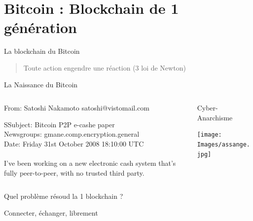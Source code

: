 \documentclass{beamer}
\begin{document}
\section{Bitcoin : Blockchain de 1\iere{} génération}
\label{sec:org863a5c7}
\begin{frame}[label={sec:org5d99e7b}]{La blockchain du Bitcoin}
  \begin{verse}
    Toute action engendre une réaction (3\ieme{} loi de Newton)\\
  \end{verse}
\end{frame}
\begin{frame}[label={sec:org3969a5e}]{La Naissance du Bitcoin}
  \begin{columns}
    \begin{column}{0.70\columnwidth}
      \begin{block}{From: Satoshi Nakamoto satoshi@vistomail.com}
        \begin{verbatiminput}
          SSubject: Bitcoin P2P e-cashe paper\\
          Newsgroups: gmane.comp.encryption.general\\
          Date: Friday 31st October 2008 18:10:00 UTC\\
          ~\\
          I've been working on a new electronic cash system that's fully peer-to-peer, with no trusted third party.
        \end{verbatiminput}
      \end{block}
    \end{column}
    \begin{column}{0.30\columnwidth}
      \begin{block}{Cyber-Anarchisme}
        \begin{center}
          \texttt{[image: Images/assange.jpg]}
        \end{center}
      \end{block}
    \end{column}
  \end{columns}
\end{frame}

\begin{frame}[label={sec:orgc45170e}]{Quel problème résoud la 1\iere{} blockchain ?}
  \begin{block}{Connecter, échanger, librement}


  \end{block}
\end{frame}
\end{document}
